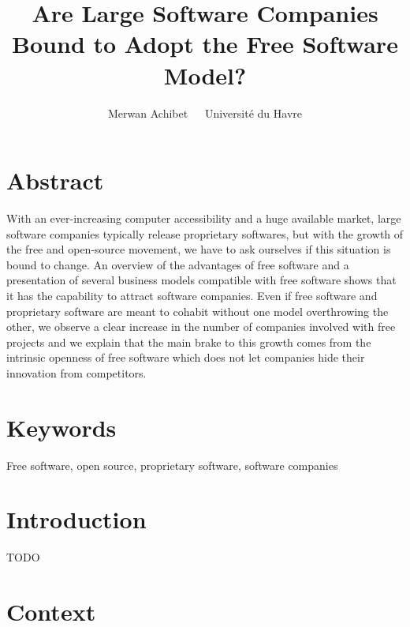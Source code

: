 \documentclass[12pt]{article}
\title{Are Large Software Companies Bound to Adopt the Free Software Model?}
\author{Merwan Achibet $\;$ \textendash $\;$  Université du Havre}
\date{}
\begin{document}
\maketitle

\section*{Abstract}

With an ever-increasing computer accessibility and a huge available
market, large software companies typically release proprietary
softwares, but with the growth of the free and open-source movement,
we have to ask ourselves if this situation is bound to change. An
overview of the advantages of free software and a presentation of
several business models compatible with free software shows that it
has the capability to attract software companies. Even if free
software and proprietary software are meant to cohabit without one
model overthrowing the other, we observe a clear increase in the
number of companies involved with free projects and we explain that
the main brake to this growth comes from the intrinsic openness of
free software which does not let companies hide their innovation from
competitors.

\section*{Keywords}

Free software, open source, proprietary software, software companies

\newpage

\tableofcontents

\newpage

\section*{Introduction}

TODO

\section{Context}
\end{document}

